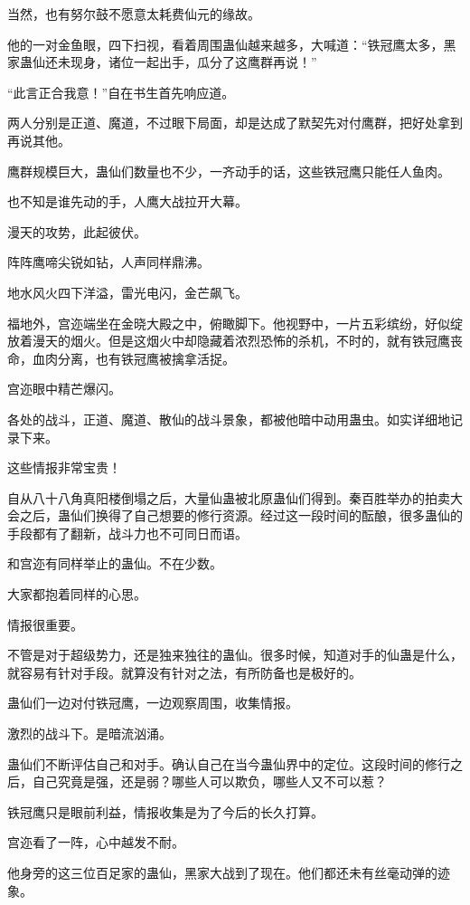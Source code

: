 \begin{this_body}
当然，也有努尔鼓不愿意太耗费仙元的缘故。

他的一对金鱼眼，四下扫视，看着周围蛊仙越来越多，大喊道：“铁冠鹰太多，黑家蛊仙还未现身，诸位一起出手，瓜分了这鹰群再说！”

“此言正合我意！”自在书生首先响应道。

两人分别是正道、魔道，不过眼下局面，却是达成了默契先对付鹰群，把好处拿到再说其他。

鹰群规模巨大，蛊仙们数量也不少，一齐动手的话，这些铁冠鹰只能任人鱼肉。

也不知是谁先动的手，人鹰大战拉开大幕。

漫天的攻势，此起彼伏。

阵阵鹰啼尖锐如钻，人声同样鼎沸。

地水风火四下洋溢，雷光电闪，金芒飙飞。

福地外，宫迩端坐在金晓大殿之中，俯瞰脚下。他视野中，一片五彩缤纷，好似绽放着漫天的烟火。但是这烟火中却隐藏着浓烈恐怖的杀机，不时的，就有铁冠鹰丧命，血肉分离，也有铁冠鹰被擒拿活捉。

宫迩眼中精芒爆闪。

各处的战斗，正道、魔道、散仙的战斗景象，都被他暗中动用蛊虫。如实详细地记录下来。

这些情报非常宝贵！

自从八十八角真阳楼倒塌之后，大量仙蛊被北原蛊仙们得到。秦百胜举办的拍卖大会之后，蛊仙们换得了自己想要的修行资源。经过这一段时间的酝酿，很多蛊仙的手段都有了翻新，战斗力也不可同日而语。

和宫迩有同样举止的蛊仙。不在少数。

大家都抱着同样的心思。

情报很重要。

不管是对于超级势力，还是独来独往的蛊仙。很多时候，知道对手的仙蛊是什么，就容易有针对手段。就算没有针对之法，有所防备也是极好的。

蛊仙们一边对付铁冠鹰，一边观察周围，收集情报。

激烈的战斗下。是暗流汹涌。

蛊仙们不断评估自己和对手。确认自己在当今蛊仙界中的定位。这段时间的修行之后，自己究竟是强，还是弱？哪些人可以欺负，哪些人又不可以惹？

铁冠鹰只是眼前利益，情报收集是为了今后的长久打算。

宫迩看了一阵，心中越发不耐。

他身旁的这三位百足家的蛊仙，黑家大战到了现在。他们都还未有丝毫动弹的迹象。


\end{this_body}
